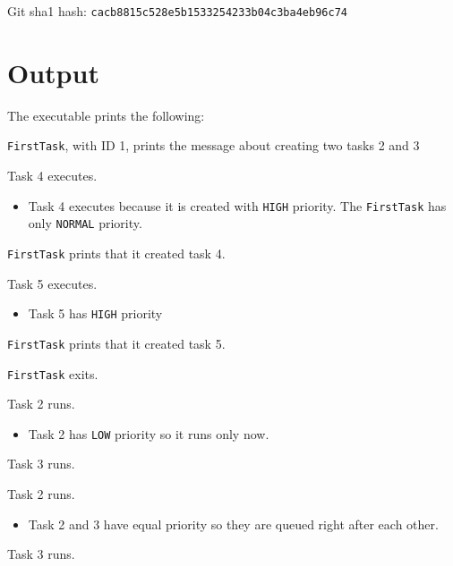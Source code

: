\documentclass[letterpaper,12pt]{article}
\begin{document}
Git sha1 hash: \texttt{cacb8815c528e5b1533254233b04c3ba4eb96c74}


\section{Output%
  \label{output}%
}

The executable prints the following:
\setcounter{listcnt0}{0}
\begin{list}{.}
{
\setlength{\rightmargin}{\leftmargin}
}

\item \texttt{FirstTask}, with ID 1, prints the message about creating two tasks 2 and 3

\item Task 4 executes.
%
\begin{itemize}

\item Task 4 executes because it is created with \texttt{HIGH} priority. The \texttt{FirstTask} has only \texttt{NORMAL} priority.

\end{itemize}

\item \texttt{FirstTask} prints that it created task 4.

\item Task 5 executes.
%
\begin{itemize}

\item Task 5 has \texttt{HIGH} priority

\end{itemize}

\item \texttt{FirstTask} prints that it created task 5.

\item \texttt{FirstTask} exits.

\item Task 2 runs.
%
\begin{itemize}

\item Task 2 has \texttt{LOW} priority so it runs only now.

\end{itemize}

\item Task 3 runs.

\item Task 2 runs.
%
\begin{itemize}

\item Task 2 and 3 have equal priority so they are queued right after each other.

\end{itemize}

\item Task 3 runs.
\end{list}
\end{document}

